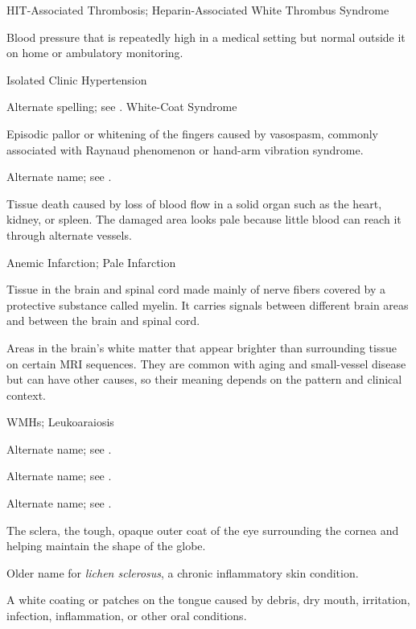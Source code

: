 \synonyms
HIT-Associated Thrombosis; Heparin-Associated White Thrombus Syndrome

 Blood pressure that is repeatedly high in a medical setting but normal outside it on home or ambulatory monitoring.

\synonyms
Isolated Clinic Hypertension

 Alternate spelling; see .
\synonyms
White-Coat Syndrome

 Episodic pallor or whitening of the fingers caused by vasospasm, commonly associated with Raynaud phenomenon or hand-arm vibration syndrome.

 Alternate name; see .

 Tissue death caused by loss of blood flow in a solid organ such as the heart, kidney, or spleen. The damaged area looks pale because little blood can reach it through alternate vessels.

\synonyms
Anemic Infarction; Pale Infarction

 Tissue in the brain and spinal cord made mainly of nerve fibers covered by a protective substance called myelin. It carries signals between different brain areas and between the brain and spinal cord.

 Areas in the brain's white matter that appear brighter than surrounding tissue on certain MRI sequences. They are common with aging and small-vessel disease but can have other causes, so their meaning depends on the pattern and clinical context.

\synonyms
WMHs; Leukoaraiosis

 Alternate name; see .

 Alternate name; see .

 Alternate name; see .

 The sclera, the tough, opaque outer coat of the eye surrounding the cornea and helping maintain the shape of the globe.

 Older name for \textit{lichen sclerosus}, a chronic inflammatory skin condition.

 A white coating or patches on the tongue caused by debris, dry mouth, irritation, infection, inflammation, or other oral conditions.

